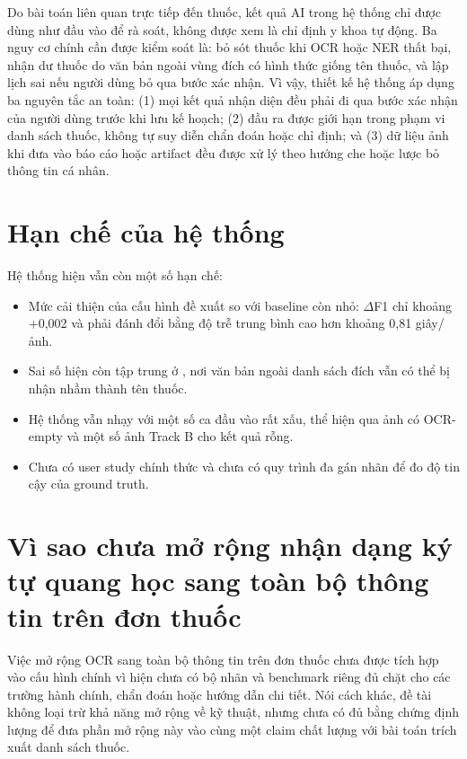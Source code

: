 \documentclass[12pt,a4paper]{report}
\begin{document}
Do bài toán liên quan trực tiếp đến thuốc, kết quả AI trong hệ thống chỉ được dùng như đầu vào để rà soát, không được xem là chỉ định y khoa tự động. Ba nguy cơ chính cần được kiểm soát là: bỏ sót thuốc khi OCR hoặc NER thất bại, nhận dư thuốc do văn bản ngoài vùng đích có hình thức giống tên thuốc, và lập lịch sai nếu người dùng bỏ qua bước xác nhận. Vì vậy, thiết kế hệ thống áp dụng ba nguyên tắc an toàn: (1) mọi kết quả nhận diện đều phải đi qua bước xác nhận của người dùng trước khi lưu kế hoạch; (2) đầu ra được giới hạn trong phạm vi danh sách thuốc, không tự suy diễn chẩn đoán hoặc chỉ định; và (3) dữ liệu ảnh khi đưa vào báo cáo hoặc artifact đều được xử lý theo hướng che hoặc lược bỏ thông tin cá nhân.

\section{Hạn chế của hệ thống}

Hệ thống hiện vẫn còn một số hạn chế:

\begin{itemize}[leftmargin=1.5cm]
    \item Mức cải thiện của cấu hình đề xuất so với baseline còn nhỏ: \(\Delta\)F1 chỉ khoảng +0,002 và phải đánh đổi bằng độ trễ trung bình cao hơn khoảng 0,81 giây/ảnh.
    \item Sai số hiện còn tập trung ở , nơi văn bản ngoài danh sách đích vẫn có thể bị nhận nhầm thành tên thuốc.
    \item Hệ thống vẫn nhạy với một số ca đầu vào rất xấu, thể hiện qua ảnh  có OCR-empty và một số ảnh Track B cho kết quả rỗng.
    \item Chưa có user study chính thức và chưa có quy trình đa gán nhãn để đo độ tin cậy của ground truth.
\end{itemize}

\section{Vì sao chưa mở rộng nhận dạng ký tự quang học sang toàn bộ thông tin trên đơn thuốc}

Việc mở rộng OCR sang toàn bộ thông tin trên đơn thuốc chưa được tích hợp vào cấu hình chính vì hiện chưa có bộ nhãn và benchmark riêng đủ chặt cho các trường hành chính, chẩn đoán hoặc hướng dẫn chi tiết. Nói cách khác, đề tài không loại trừ khả năng mở rộng về kỹ thuật, nhưng chưa có đủ bằng chứng định lượng để đưa phần mở rộng này vào cùng một claim chất lượng với bài toán trích xuất danh sách thuốc.
\end{document}
